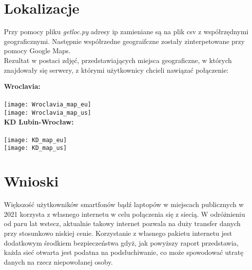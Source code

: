 \documentclass[12pt,a4paper]{article}
\begin{document}
    \section{Lokalizacje}
        Przy pomocy pliku \textit{getloc.py} adresy ip zamieniane są na plik csv z współrzędnymi geograficznymi. Następnie współrzedne geograifczne zostały zinterpetowane przy pomocy Google Maps.\\
        Rezultat w postaci zdjęć, przedstawiających miejsca geograficzne, w których znajdowały się serwery, z którymi użytkownicy chcieli nawiązać połączenie:
        \begin{multicols}{2}
            \begin{center}
                \textbf{Wroclavia:}\\~\\
                \texttt{[image: Wroclavia\_map\_eu]}\\
                \texttt{[image: Wroclavia\_map\_us]}\\
                \textbf{KD Lubin-Wrocław:}\\~\\
                \texttt{[image: KD\_map\_eu]}\\
                \texttt{[image: KD\_map\_us]}\\
            \end{center}
        \end{multicols}
    \section{Wnioski}
        Większość użytkowników smartfonów bądź laptopów w miejscach publicznych w 2021 korzysta z własnego internetu w celu połączenia się z siecią. W odróżnieniu od paru lat wstecz, aktualnie takowy internet pozwala na duży transfer danych przy stosunkowo niskiej cenie. Korzystanie z własnego pakietu internetu jest dodatkowym środkiem bezpieczeństwa gdyż, jak powyższy raport przedstawia, każda sieć otwarta jest podatna na podsłuchiwanie, co może spowodować utratę danych na rzecz niepowołanej osoby.
\end{document}
